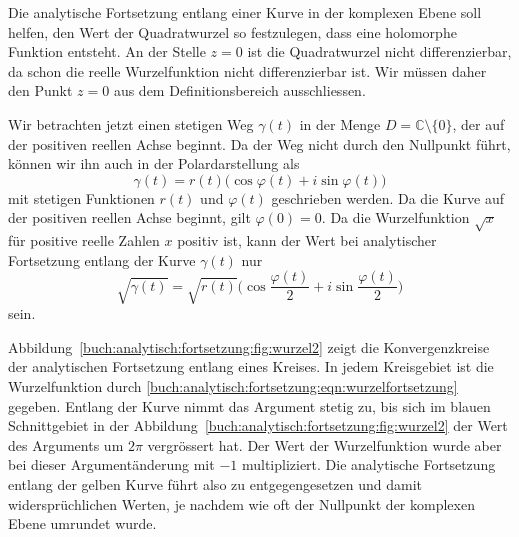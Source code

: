 Die analytische Fortsetzung entlang einer Kurve in der komplexen
Ebene soll helfen, den Wert der Quadratwurzel so festzulegen,
dass eine holomorphe Funktion entsteht.
An der Stelle $z=0$ ist die Quadratwurzel nicht differenzierbar,
da schon die reelle Wurzelfunktion nicht differenzierbar ist.
Wir müssen daher den Punkt $z=0$ aus dem Definitionsbereich
ausschliessen.

Wir betrachten jetzt einen stetigen Weg $\gamma(t)$ in der Menge
$D=\mathbb{C}\setminus\{0\}$, der auf der positiven reellen
Achse beginnt.
Da der Weg nicht durch den Nullpunkt führt, können wir ihn
auch in der Polardarstellung als
\[
\gamma(t)
=
r(t)
\bigl(
\cos\varphi(t)
+
i\sin\varphi(t)
\bigr)
\]
mit stetigen Funktionen $r(t)$ und $\varphi(t)$ geschrieben
werden.
Da die Kurve auf der positiven reellen Achse beginnt, gilt
$\varphi(0)=0$.
Da die Wurzelfunktion $\!\sqrt{x}$ für positive reelle Zahlen $x$
positiv ist, kann der Wert bei analytischer Fortsetzung entlang
der Kurve $\gamma(t)$ nur
\begin{equation}
\!\sqrt{\gamma(t)}
=
\!\sqrt{r(t)}
\biggl(
\cos\frac{\varphi(t)}2
+
i
\sin\frac{\varphi(t)}2
\biggr)
\label{buch:analytisch:fortsetzung:eqn:wurzelfortsetzung}
\end{equation}
sein.

Abbildung~\ref{buch:analytisch:fortsetzung:fig:wurzel2} zeigt die
Konvergenzkreise der analytischen Fortsetzung entlang eines Kreises.
In jedem Kreisgebiet ist die Wurzelfunktion durch 
\eqref{buch:analytisch:fortsetzung:eqn:wurzelfortsetzung}
gegeben.
Entlang der Kurve nimmt das Argument stetig zu, bis sich im
blauen Schnittgebiet in der
Abbildung~\ref{buch:analytisch:fortsetzung:fig:wurzel2}
der Wert des Arguments um $2\pi$ vergrössert hat.
Der Wert der Wurzelfunktion wurde aber bei dieser Argumentänderung
mit $-1$ multipliziert.
Die analytische Fortsetzung entlang der gelben Kurve führt also
zu entgegengesetzen und damit widersprüchlichen Werten, je nachdem wie
oft der Nullpunkt der komplexen Ebene umrundet wurde.



%
%
